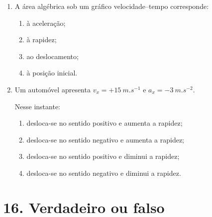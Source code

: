 \documentclass[11pt,a4paper]{article}
\begin{document}
\begin{enumerate}[label=\textbf{\arabic*.},resume]
\begin{enumerate}[label=\Alph*.]
			\item a rapidez diminui enquanto o corpo mantiver $v_x<0$;
			
			\item o corpo está em repouso;
			
			\item a aceleração é nula.
			
		\end{enumerate}
		
		\item A área algébrica sob um gráfico velocidade--tempo corresponde:
		
		\begin{enumerate}[label=\Alph*.]
			
			\item à aceleração;
			
			\item à rapidez;
			
			\item ao deslocamento;
			
			\item à posição inicial.
			
		\end{enumerate}
		
		\item Um automóvel apresenta $v_x=+\SI{15}{m.s^{-1}}$ e
		$a_x=-\SI{3}{m.s^{-2}}$.
		
		Nesse instante:
		
		\begin{enumerate}[label=\Alph*.]
			
			\item desloca-se no sentido positivo e aumenta a rapidez;
			
			\item desloca-se no sentido negativo e aumenta a rapidez;
			
			\item desloca-se no sentido positivo e diminui a rapidez;
			
			\item desloca-se no sentido negativo e diminui a rapidez.
			
		\end{enumerate}
		
	\end{enumerate}
	
	\section{16. Verdadeiro ou falso}
	
\end{document}
